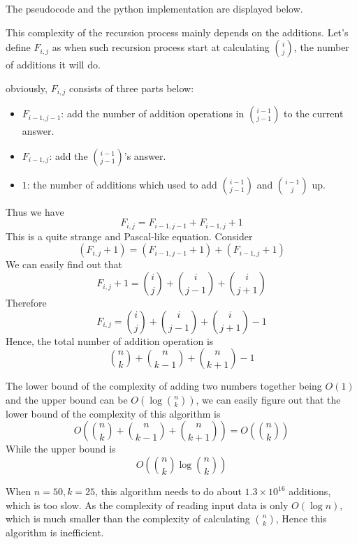 The pseudocode and the python implementation are displayed below.


This complexity of the recursion process mainly depends on the additions.
Let's define $F_{i, j}$ as when such recursion process start at calculating $\binom{i}{j}$,
the number of additions it will do.

obviously, $F_{i, j}$ consists of three parts below:
\begin{itemize}
\item $F_{i - 1, j - 1}$: add the number of addition operations in $\binom{i - 1}{j - 1}$ to the current answer.
\item $F_{i - 1, j}$: add the $\binom{i - 1}{j - 1}$'s answer.
\item $1$: the number of additions which used to add $\binom{i - 1}{j - 1}$ and $\binom{i - 1}{j}$ up.
\end{itemize}

Thus we have
\begin{equation}\label{equation3}
F_{i, j} = F_{i - 1, j - 1} + F_{i - 1, j} + 1
\end{equation}
This is a quite strange and Pascal-like equation.
Consider
\[(F_{i, j} + 1) = (F_{i - 1, j - 1} + 1) + (F_{i-1, j} + 1)\]
We can easily find out that
\[F_{i, j} + 1 = \binom{i}{j} + \binom{i}{j-1} + \binom{i}{j+1}\]
Therefore
\begin{equation}\label{equation4}
F_{i, j} = \binom{i}{j} + \binom{i}{j-1} + \binom{i}{j+1} - 1
\end{equation}
Hence, the total number of addition operation is
\[\binom{n}{k} + \binom{n}{k-1} + \binom{n}{k+1} - 1\]

The lower bound of the complexity of adding two numbers together being $O(1)$ and the upper bound can be $O(\log\binom{n}{k})$,
we can easily figure out that the lower bound of the complexity of this algorithm is
\[O\left(\binom{n}{k} + \binom{n}{k-1} + \binom{n}{k+1}\right) = O\left(\binom{n}{k}\right)\]
While the upper bound is
\[O\left(\binom{n}{k}\log \binom{n}{k}\right)\]

When $n = 50, k = 25$, this algorithm needs to do about $1.3 \times 10^{16}$ additions, which is too slow. As the complexity of reading input data is only $O(\log n)$, which is much smaller than the complexity of calculating $\binom{n}{k}$, Hence this algorithm is inefficient.
